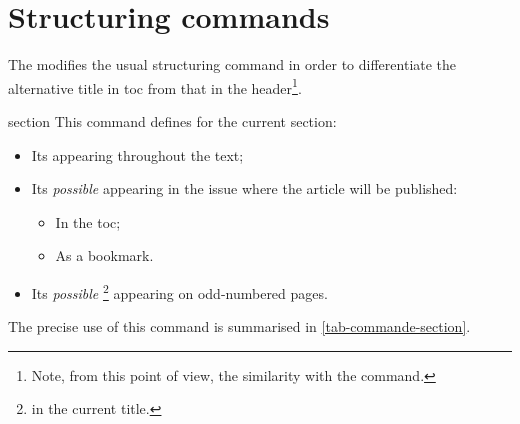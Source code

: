 \documentclass[english,nolocaltoc]{nwejmart}
\newtheorem[style=definition]{fact}
\newtheorem[title=experience]{experience}
\newtheorem[title-plural=rings]{ring}
\newtheorem[title=ideal,title-plural=ideals]{ideal}
\begin{document}
\section{Structuring commands}

The \nwejmauthorcl{} modifies the usual 
 structuring command in order to differentiate
the alternative title in \gls{toc} from that in the
header\footnote{Note, from this point of view, the similarity with the
  \protect{} command.}.

\begin{docCommand}[doc new=2017-10-23]{section}{}
  This command defines for the current section:
  \begin{itemize}
  \item Its  appearing throughout the text;
  \item Its \emph{possible}  appearing in the issue
    where the article will be published:
    \begin{itemize}
    \item In the \gls{toc};
    \item As a bookmark.
    \end{itemize}
  \item Its \emph{possible} \footnote{\Ie{} in the current title.} appearing
    on odd-numbered pages.
  \end{itemize}
  The precise use of this command is summarised in \vref{tab-commande-section}.
\end{docCommand}
\end{document}
